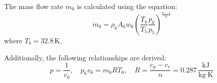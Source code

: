 The mass flow rate \( \dot{m}_0 \) is calculated using the equation:  
\[
\dot{m}_0 = \rho_6 A_6 w_6 \left( \frac{T_b}{T_5} \frac{p_0}{p_5} \right)^{\frac{n-1}{n}}
\]  
where \( T_b = 32.8 \, \text{K} \).  

Additionally, the following relationships are derived:  
\[
p = \frac{1}{v_0}, \quad p_6 v_6 = m_6 R T_6, \quad R = \frac{c_p - c_v}{n} = 0.287 \, \frac{\text{kJ}}{\text{kg·K}}
\]